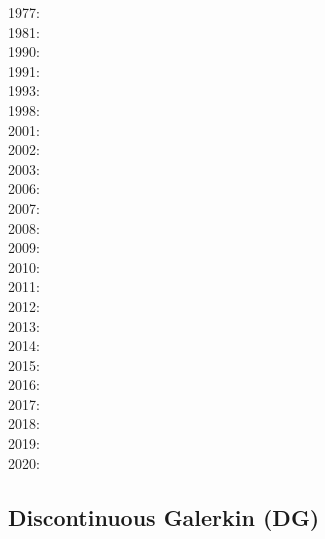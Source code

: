 \noindent
{\scriptsize
1977: \cite{rola77}\\
1981: \cite{dzan81}\\
1990: \cite{lips90}\\
1991: \cite{spak91}\\
1993: \cite{kara93}\\
1998: \cite{bisp98}\\
2001: \cite{buda01}\\
2002: \cite{bebo02}\\
2003: \cite{krhh03}\cite{sosi03}\cite{pimo03}\cite{sosi03}\\
2006: \cite{masr06}\cite{arte06}\\
2007: \cite{mitk07}\cite{lobc07}\cite{rimb07}\\
2008: \cite{zhou08}\cite{zhou08}\cite{roma08}\cite{tekc08}\\
2009: \cite{scbr09}\\
2010: \cite{dada10}\cite{sifb10}\cite{katc10}\\
2011: \cite{ridv11}\\
2012: \cite{hawj12}\cite{resa12}\cite{hawj12}\cite{fesw12}\cite{simj12}\cite{beck12}\cite{pahk12}\\
2013: \cite{ress13}\cite{ebbf13}\cite{davi13}\cite{scle13}\cite{waja13}\\
2014: \cite{paml14}\cite{ebbf14}\cite{krbk14}\cite{licl14}\cite{aubb14}\\
2015: \cite{boem15}\cite{brrs15}\cite{furc15}\\
2016: \cite{kord16}\cite{moek16}\cite{rond16}\cite{duti16}\cite{cogb16}\\
2017: \cite{roev17}\\
2018: \cite{pabn18}\cite{hamp18}\cite{ghmc18}\cite{homs18}\\
2019: \cite{sopg19}\cite{shar19}\cite{afss19}\\
2020: \cite{rovb20}
}

\subsection{Discontinuous Galerkin (DG)}

